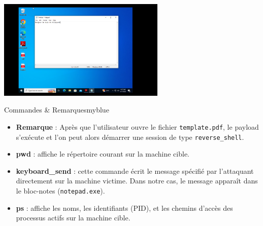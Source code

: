 \vspace{0.15cm}
\begin{center}
    \includegraphics[width=0.6\textwidth]{Question/SC/20_2.PNG}
\end{center}



\vspace{0.35cm}


\begin{prettyBox}{Commandes \& Remarques}{myblue}
    \begin{itemize}
        \item \textbf{Remarque} : Après que l'utilisateur ouvre le fichier \texttt{template.pdf}, le payload s'exécute et l'on peut alors démarrer une session de type \texttt{reverse\_shell}.
        \item \textbf{pwd} : affiche le répertoire courant sur la machine cible.
        \item \textbf{keyboard\_send} : cette commande écrit le message spécifié par l'attaquant directement sur la machine victime. Dans notre cas, le message apparaît dans le bloc-notes (\texttt{notepad.exe}).
        \item \textbf{ps} : affiche les noms, les identifiants (PID), et les chemins d'accès des processus actifs sur la machine cible.
    \end{itemize}
\end{prettyBox}

